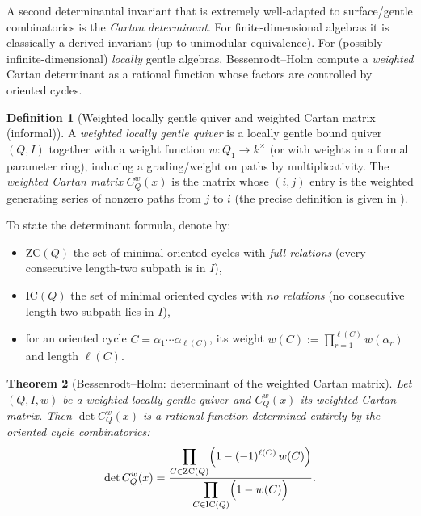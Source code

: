 \documentclass[11pt,oneside]{amsbook}
\numberwithin{equation}{section}
\theoremstyle{plain}
\newtheorem{theorem}{Theorem}[section]
\theoremstyle{definition}
\newtheorem{definition}[theorem]{Definition}
\theoremstyle{remark}
\begin{document}
A second determinantal invariant that is extremely well-adapted to surface/gentle combinatorics is the \emph{Cartan determinant}.
For finite-dimensional algebras it is classically a derived invariant (up to unimodular equivalence).
For (possibly infinite-dimensional) \emph{locally} gentle algebras, Bessenrodt--Holm compute a \emph{weighted} Cartan determinant as a rational function whose factors are controlled by oriented cycles.

\begin{definition}[Weighted locally gentle quiver and weighted Cartan matrix (informal)]
A \emph{weighted locally gentle quiver} is a locally gentle bound quiver $(Q,I)$ together with a weight function $w:Q_1\to k^\times$ (or with weights in a formal parameter ring), inducing a grading/weight on paths by multiplicativity.
The \emph{weighted Cartan matrix} $C_Q^w(x)$ is the matrix whose $(i,j)$ entry is the weighted generating series of nonzero paths from $j$ to $i$ (the precise definition is given in \cite{BessenrodtHolm2005WeightedLocallyGentle}).
\end{definition}

To state the determinant formula, denote by:
\begin{itemize}
\item $\mathrm{ZC}(Q)$ the set of minimal oriented cycles with \emph{full relations} (every consecutive length-two subpath is in $I$),
\item $\mathrm{IC}(Q)$ the set of minimal oriented cycles with \emph{no relations} (no consecutive length-two subpath lies in $I$),
\item for an oriented cycle $C=\alpha_1\cdots \alpha_{\ell(C)}$, its weight $w(C):=\prod_{r=1}^{\ell(C)} w(\alpha_r)$ and length $\ell(C)$.
\end{itemize}

\begin{theorem}[Bessenrodt--Holm: determinant of the weighted Cartan matrix]
\label{thm:BH_weighted_cartan_det}
Let $(Q,I,w)$ be a weighted locally gentle quiver and $C_Q^w(x)$ its weighted Cartan matrix.
Then $\det C_Q^w(x)$ is a rational function determined entirely by the oriented cycle combinatorics:
\begin{equation}
\label{eq:BH_cartan_det}
\det C_Q^w(x)
=
\frac{\displaystyle\prod_{C\in \mathrm{ZC}(Q)} \Bigl(1-(-1)^{\ell(C)}\,w(C)\Bigr)}
{\displaystyle\prod_{C\in \mathrm{IC}(Q)} \Bigl(1-w(C)\Bigr)}.
\end{equation}
\end{theorem}
\end{document}

